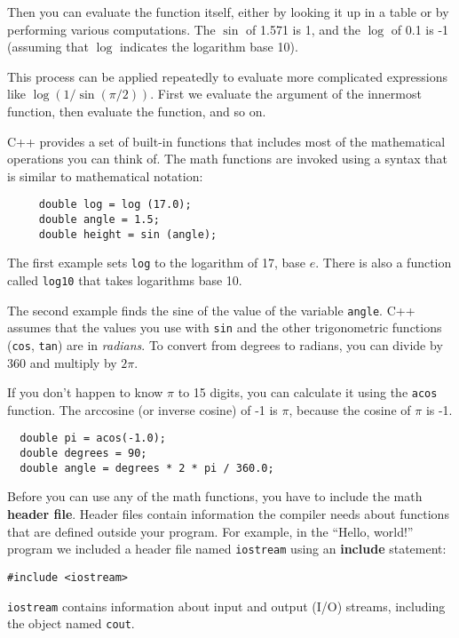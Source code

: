 Then you can evaluate the function itself, either by looking it up in
a table or by performing various computations.  The $\sin$ of 1.571 is
1, and the $\log$ of 0.1 is -1 (assuming that $\log$ indicates the
logarithm base 10).

This process can be applied repeatedly to evaluate more complicated
expressions like $\log(1/\sin(\pi/2))$.  First we evaluate the
argument of the innermost function, then evaluate the function,
and so on.

C++ provides a set of built-in functions that includes most
of the mathematical operations you can think of.
The math functions are invoked using a syntax that is similar to
mathematical notation:

\begin{lstlisting}
     double log = log (17.0);
     double angle = 1.5;
     double height = sin (angle);
\end{lstlisting}
%
The first example sets {\tt log} to the logarithm of 17, base
$e$.  There is also a function called {\tt log10} that takes
logarithms base 10.

The second example finds the sine of the value of the variable
{\tt angle}.  C++ assumes that the
values you use with {\tt sin} and the other trigonometric functions
({\tt cos}, {\tt tan}) are in {\em radians}.  To
convert from degrees to radians, you can divide by 360
and multiply by $2 \pi$.  

If you don't happen to know $\pi$ to 15 digits, you can
calculate it using the {\tt acos} function.  The arccosine
(or inverse cosine) of -1 is $\pi$, because the cosine of
$\pi$ is -1.

\begin{lstlisting}
  double pi = acos(-1.0);
  double degrees = 90;
  double angle = degrees * 2 * pi / 360.0;
\end{lstlisting}
%
Before you can use any of the math functions, you have to
include the math {\bf header file}.  Header files contain
information the compiler needs about functions that are defined
outside your program.  For example, in the ``Hello, world!''
program we included a header file named {\tt iostream} using
an {\bf include} statement:

\begin{lstlisting}
#include <iostream>
\end{lstlisting}
%
{\tt iostream} contains information about input and output
(I/O) streams, including the object named {\tt cout}.


